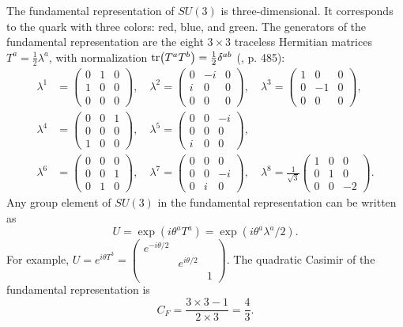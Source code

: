 \documentclass[12pt]{article}
\begin{document}
	The fundamental representation of $SU(3)$ is three-dimensional. It corresponds to the quark with three colors: red, blue, and green. The generators of the fundamental representation are the eight $3\times 3$ traceless Hermitian matrices $T^a = \frac{1}{2}\lambda^a$, with normalization $\tr(T^aT^b) = \frac12 \delta^{ab}$ (\cite{schwartz1}, p. 485):
	\begin{align}
		\lambda^1 &= \begin{pmatrix} 0 & 1 & 0 \\ 1 & 0 & 0 \\ 0 & 0 & 0 \end{pmatrix}, \quad
		\lambda^2 = \begin{pmatrix} 0 & -i & 0 \\ i & 0 & 0 \\ 0 & 0 & 0 \end{pmatrix}, \quad
		\lambda^3 = \begin{pmatrix} 1 & 0 & 0 \\ 0 & -1 & 0 \\ 0 & 0 & 0 \end{pmatrix}, \nonumber\\
		\lambda^4 &= \begin{pmatrix} 0 & 0 & 1 \\ 0 & 0 & 0 \\ 1 & 0 & 0 \end{pmatrix}, \quad
		\lambda^5 = \begin{pmatrix} 0 & 0 & -i \\ 0 & 0 & 0 \\ i & 0 & 0 \end{pmatrix}, \nonumber\\
		\lambda^6 &= \begin{pmatrix} 0 & 0 & 0 \\ 0 & 0 & 1 \\ 0 & 1 & 0 \end{pmatrix}, \quad
		\lambda^7 = \begin{pmatrix} 0 & 0 & 0 \\ 0 & 0 & -i \\ 0 & i & 0 \end{pmatrix}, \quad
		\lambda^8 = \frac{1}{\sqrt{3}}\begin{pmatrix} 1 & 0 & 0 \\ 0 & 1 & 0 \\ 0 & 0 & -2 \end{pmatrix}. \label{Gellmann mtx}
	\end{align}
	Any group element of $SU(3)$ in the fundamental representation can be written as
	\begin{equation}
		U = \exp(i\theta^aT^a) = \exp(i\theta^a\lambda^a/2).
	\end{equation}
	For example, $U = e^{i\theta T^3} = \begin{pmatrix}
		e^{-i\theta/2} &  & \\
		& e^{i\theta/2} & \\
		& & 1
	\end{pmatrix}.$
	The quadratic Casimir of the fundamental representation is
	\begin{equation}
		C_F = \frac{3 \times 3 - 1}{2 \times 3} = \frac{4}{3}.
	\end{equation}
	
\end{document}
